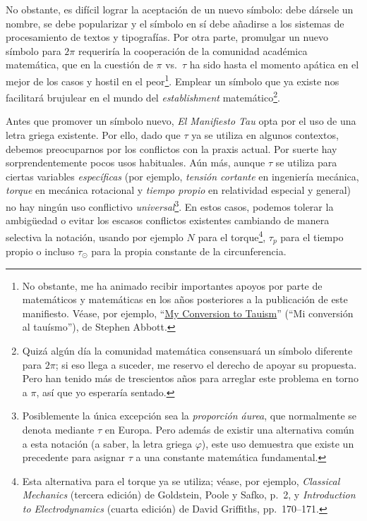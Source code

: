 No obstante, es difícil lograr la aceptación de un nuevo símbolo: debe dársele un nombre, se debe popularizar y el símbolo en sí debe añadirse a los sistemas de procesamiento de textos y tipografías. Por otra parte, promulgar un nuevo símbolo para $2\pi$ requeriría la cooperación de la comunidad académica matemática, que en la cuestión de $\pi$ vs.\ $\tau$ ha sido hasta el momento apática en el mejor de los casos y hostil en el peor\footnote{No obstante, me ha animado recibir importantes apoyos por parte de matemáticos y matemáticas en los años posteriores a la publicación de este manifiesto. Véase, por ejemplo, ``\href{https://www.maa.org/sites/default/files/pdf/Mathhorizons/apr12_aftermath.pdf}{My Conversion to Tauism}'' (``Mi conversión al tauísmo''), de Stephen Abbott.}. Emplear un símbolo que ya existe nos facilitará brujulear en el mundo del \emph{establishment} matemático\footnote{Quizá algún día la comunidad matemática consensuará un símbolo diferente para $2\pi$; si eso llega a suceder, me reservo el derecho de apoyar su propuesta. Pero han tenido más de trescientos años para arreglar este problema en torno a $\pi$, así que yo esperaría sentado.}.

Antes que promover un símbolo nuevo, \emph{El Manifiesto Tau} opta por el uso de una letra griega existente. Por ello, dado que $\tau$ ya se utiliza en algunos contextos, debemos preocuparnos por los conflictos con la praxis actual. Por suerte hay sorprendentemente pocos usos habituales. Aún más, aunque $\tau$ se utiliza para ciertas variables \emph{específicas} (por ejemplo, \emph{tensión cortante} en ingeniería mecánica, \emph{torque} en mecánica rotacional y \emph{tiempo propio} en relatividad especial y general) no hay ningún uso conflictivo \emph{universal}\footnote{Posiblemente la única excepción sea la \emph{proporción áurea}, que normalmente se denota mediante $\tau$ en Europa. Pero además de existir una alternativa común a esta notación (a saber, la letra griega $\varphi$), este uso demuestra que existe un precedente para asignar $\tau$ a una constante matemática fundamental.}. En estos casos, podemos tolerar la ambigüedad o evitar los escasos conflictos existentes cambiando de manera selectiva la notación, usando por ejemplo $N$ para el torque\footnote{Esta alternativa para el torque ya se utiliza; véase, por ejemplo, \emph{Classical Mechanics} (tercera edición) de Goldstein, Poole y Safko, p.~2, y \emph{Introduction to Electrodynamics} (cuarta edición) de David Griffiths, pp.~170–171.}, $\tau_p$ para el tiempo propio o incluso $\tau_\odot$ para la propia constante de la circunferencia.

